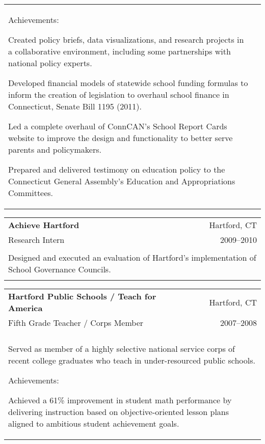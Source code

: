 \documentclass[letterpaper,11pt]{article}
\begin{document}
\begin{minipage}{.9\textwidth}
\begin{tabular*}{\textwidth}{l @{\extracolsep{\fill}} r}
{  \vspace{2mm}
  Achievements:
  \begin{itemize*}
    \item Created policy briefs, data visualizations, and research projects in a collaborative environment, including some partnerships with national policy experts. 
    \item Developed financial models of statewide school funding formulas to inform the creation of legislation to overhaul school finance in Connecticut, Senate Bill 1195 (2011). 
    \item Led a complete overhaul of ConnCAN's School Report Cards website to improve the design and functionality to better serve parents and policymakers.
    \item Prepared and delivered testimony on education policy to the Connecticut General Assembly's Education and Appropriations Committees.
  \end{itemize*}}
\end{tabular*}


\noindent\begin{tabular*}{\textwidth}{l @{\extracolsep{\fill}} r}
  \textbf{Achieve Hartford}& \ {\color{Gray}Hartford, CT} \\
  {\color{Gray}Research Intern} & \ {\color{Gray}2009--2010} \\\\
  \multicolumn{2}{p{\textwidth}}{Designed and executed an evaluation of Hartford's implementation of School Governance Councils.}\\\\
\end{tabular*}

\noindent\begin{tabular*}{\textwidth}{l @{\extracolsep{\fill}} r}
  \textbf{Hartford Public Schools / Teach for America}& \ {\color{Gray}Hartford, CT} \\
  {\color{Gray}Fifth Grade Teacher / Corps Member} & \ {\color{Gray}2007--2008} \\\\
  \multicolumn{2}{p{\textwidth}}{Served as member of a highly selective national service corps of recent college graduates who teach in under-resourced public schools.

  \vspace{2mm}
  Achievements:
  \begin{itemize*}
    \item Achieved a 61\% improvement in student math performance by delivering instruction based on objective-oriented lesson plans aligned to ambitious student achievement goals.
  \end{itemize*}}
\end{tabular*}


\end{minipage}
\end{document}
